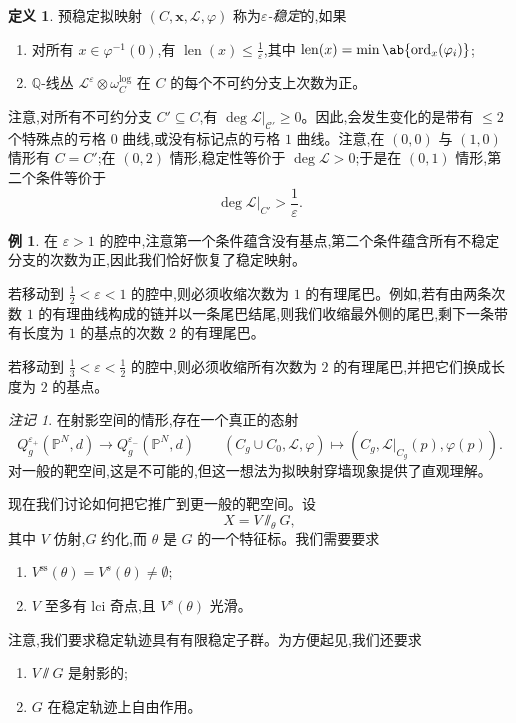 \documentclass{amsart}
\theoremstyle{definition}
\newtheorem{defn}[thm]{定义}
\newtheorem{exm}[thm]{例}
\theoremstyle{remark}
\newtheorem{rmk}[thm]{注记}
\theoremstyle{plain}
\theoremstyle{definition}
\theoremstyle{remark}
\newcommand{\Q}{\mathbb{Q}}
\renewcommand{\P}{\mathbb{P}}
\newcommand{\ep}{\varepsilon}
\newcommand{\mc}[1]{\mathcal{#1}}
\newcommand{\mr}[1]{\mathrm{#1}}
\newcommand{\on}[1]{\operatorname{#1}}
\newcommand{\1}{\mathbf{1}}
\newcommand{\2}{\mathbf{2}}
\newcommand{\3}{\mathbf{3}}
\begin{document}
\begin{defn}
    预稳定拟映射 \((C, \mathbf{x}, \mc{L}, \varphi)\) 称为\textit{\(\ep\)-稳定}的,如果
    \begin{enumerate}
        \item 对所有 \(x \in \varphi^{-1}(0)\),有 \(\on{len}(x) \leq \frac{1}{\ep}\),其中 \(\on{len}(x) = \min \ab\{ \on{ord}_x (\varphi_i)\}\);
        \item \(\Q\)-线丛 \(\mc{L}^{\ep} \otimes \omega_C^{\log}\) 在 \(C\) 的每个不可约分支上次数为正。
    \end{enumerate}
\end{defn}

注意,对所有不可约分支 \(C' \subseteq C\),有 \(\deg \mc{L}|_{\mc{C}'} \geq 0\)。因此,会发生变化的是带有 \(\leq 2\) 个特殊点的亏格 \(0\) 曲线,或没有标记点的亏格 \(1\) 曲线。注意,在 \((0,0)\) 与 \((1,0)\) 情形有 \(C = C'\);在 \((0,2)\) 情形,稳定性等价于 \(\deg \mc{L} > 0\);于是在 \((0,1)\) 情形,第二个条件等价于
\[ \deg \mc{L}|_{C'} > \frac{1}{\ep}. \]

\begin{exm}
    在 \(\ep > 1\) 的腔中,注意第一个条件蕴含没有基点,第二个条件蕴含所有不稳定分支的次数为正,因此我们恰好恢复了稳定映射。

    若移动到 \(\frac{1}{2} < \ep < 1\) 的腔中,则必须收缩次数为 \(1\) 的有理尾巴。例如,若有由两条次数 \(1\) 的有理曲线构成的链并以一条尾巴结尾,则我们收缩最外侧的尾巴,剩下一条带有长度为 \(1\) 的基点的次数 \(2\) 的有理尾巴。

    若移动到 \(\frac{1}{3} < \ep < \frac{1}{2}\) 的腔中,则必须收缩所有次数为 \(2\) 的有理尾巴,并把它们换成长度为 \(2\) 的基点。
\end{exm}

\begin{rmk}
    在射影空间的情形,存在一个真正的态射
    \[ Q_g^{\ep_+}(\P^N, d) \to Q_g^{\ep_-}(\P^N, d) \qquad (C_g \cup C_0, \mc{L}, \varphi) \mapsto (C_g, \mc{L}|_{C_g}(p), \varphi(p)). \]
    对一般的靶空间,这是不可能的,但这一想法为拟映射穿墙现象提供了直观理解。
\end{rmk}

现在我们讨论如何把它推广到更一般的靶空间。设
\[ X = V \sslash_{\theta} G, \]
其中 \(V\) 仿射,\(G\) 约化,而 \(\theta\) 是 \(G\) 的一个特征标。我们需要要求
\begin{enumerate}
    \item \(V^{\mr{ss}}(\theta) = V^s(\theta) \neq \emptyset\);
    \item \(V\) 至多有 lci 奇点,且 \(V^s(\theta)\) 光滑。
\end{enumerate}
注意,我们要求稳定轨迹具有有限稳定子群。为方便起见,我们还要求
\begin{enumerate}
    \item \(V \sslash G\) 是射影的;
    \item \(G\) 在稳定轨迹上自由作用。
\end{enumerate}
\end{document}
